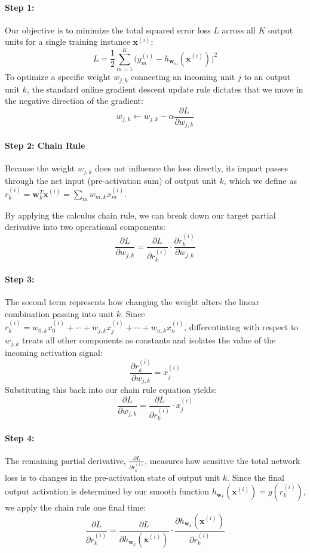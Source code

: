\paragraph{Step 1:}
Our objective is to minimize the total squared error loss $L$ across all $K$ output units for a single training instance $\mathbf{x}^{(i)}$:
\[
L = \frac{1}{2}\sum_{m=1}^K \big(y_m^{(i)} - h_{\mathbf{w}_m}(\mathbf{x}^{(i)})\big)^2
\]
To optimize a specific weight $w_{j,k}$ connecting an incoming unit $j$ to an output unit $k$, the standard online gradient descent update rule dictates that we move in the negative direction of the gradient:
\[
w_{j,k} \leftarrow w_{j,k} - \alpha \frac{\partial L}{\partial w_{j,k}}
\]

\paragraph{Step 2: Chain Rule}
Because the weight $w_{j,k}$ does not influence the loss directly, its impact passes through the net input (pre-activation sum) of output unit $k$, which we define as $r_k^{(i)} = \mathbf{w}_k^T\mathbf{x}^{(i)} = \sum_{m} w_{m,k} x_m^{(i)}$. 



By applying the calculus chain rule, we can break down our target partial derivative into two operational components:
\[
\frac{\partial L}{\partial w_{j,k}} = \frac{\partial L}{\partial r_k^{(i)}} \cdot \frac{\partial r_k^{(i)}}{\partial w_{j,k}}
\]

\paragraph{Step 3:}
The second term represents how changing the weight alters the linear combination passing into unit $k$. Since $r_k^{(i)} = w_{0,k}x_0^{(i)} + \cdots + w_{j,k}x_j^{(i)} + \cdots + w_{n,k}x_n^{(i)}$, differentiating with respect to $w_{j,k}$ treats all other components as constants and isolates the value of the incoming activation signal:
\[
\frac{\partial r_k^{(i)}}{\partial w_{j,k}} = x_j^{(i)}
\]
Substituting this back into our chain rule equation yields:
\[
\frac{\partial L}{\partial w_{j,k}} = \frac{\partial L}{\partial r_k^{(i)}} \cdot x_j^{(i)}
\]

\paragraph{Step 4:}
The remaining partial derivative, $\frac{\partial L}{\partial r_k^{(i)}}$, measures how sensitive the total network loss is to changes in the pre-activation state of output unit $k$. Since the final output activation is determined by our smooth function $h_{\mathbf{w}_k}(\mathbf{x}^{(i)}) = g(r_k^{(i)})$, we apply the chain rule one final time:
\[
\frac{\partial L}{\partial r_k^{(i)}} = \frac{\partial L}{\partial h_{\mathbf{w}_k}(\mathbf{x}^{(i)})} \cdot \frac{\partial h_{\mathbf{w}_k}(\mathbf{x}^{(i)})}{\partial r_k^{(i)}}
\]

